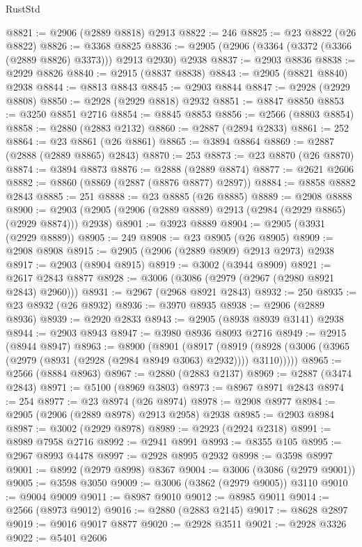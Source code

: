 \begin{lexlean}{RustStd}
\begin{coremodule}
@8821 := @2906 (@2889 @8818) @2913
@8822 := 246
@8825 := @23 @8822 (@26 @8822)
@8826 := @3368 @8825
@8836 := @2905 (@2906 (@3364 (@3372 (@3366 (@2889 @8826) @3373))) @2913 @2930) @2938
@8837 := @2903 @8836
@8838 := @2929 @8826
@8840 := @2915 (@8837 @8838)
@8843 := @2905 (@8821 @8840) @2938
@8844 := @8813 @8843
@8845 := @2903 @8844
@8847 := @2928 (@2929 @8808)
@8850 := @2928 (@2929 @8818) @2932
@8851 := @8847 @8850
@8853 := @3250 @8851 @2716
@8854 := @8845 @8853
@8856 := @2566 (@8803 @8854)
@8858 := @2880 (@2883 @2132)
@8860 := @2887 (@2894 @2833)
@8861 := 252
@8864 := @23 @8861 (@26 @8861)
@8865 := @3894 @8864
@8869 := @2887 (@2888 (@2889 @8865) @2843)
@8870 := 253
@8873 := @23 @8870 (@26 @8870)
@8874 := @3894 @8873
@8876 := @2888 (@2889 @8874)
@8877 := @2621 @2606
@8882 := @8860 (@8869 (@2887 (@8876 @8877) @2897))
@8884 := @8858 @8882 @2843
@8885 := 251
@8888 := @23 @8885 (@26 @8885)
@8889 := @2908 @8888
@8900 := @2903 (@2905 (@2906 (@2889 @8889) @2913 (@2984 (@2929 @8865) (@2929 @8874))) @2938)
@8901 := @3923 @8889
@8904 := @2905 (@3931 (@2929 @8889))
@8905 := 249
@8908 := @23 @8905 (@26 @8905)
@8909 := @2908 @8908
@8915 := @2905 (@2906 (@2889 @8909) @2913 @2973) @2938
@8917 := @2903 (@8904 @8915)
@8919 := @3002 (@3944 @8909)
@8921 := @2617 @2843 @8877
@8928 := @3006 (@3086 (@2979 (@2967 (@2980 @8921 @2843) @2960)))
@8931 := @2967 (@2968 @8921 @2843)
@8932 := 250
@8935 := @23 @8932 (@26 @8932)
@8936 := @3970 @8935
@8938 := @2906 (@2889 @8936)
@8939 := @2920 @2833
@8943 := @2905 (@8938 @8939 @3141) @2938
@8944 := @2903 @8943
@8947 := @3980 @8936 @8093 @2716
@8949 := @2915 (@8944 @8947)
@8963 := @8900
    (@8901
      (@8917
        (@8919 (@8928 (@3006 (@3965 (@2979 (@8931 (@2928 (@2984 @8949 @3063) @2932)))) @3110)))))
@8965 := @2566 (@8884 @8963)
@8967 := @2880 (@2883 @2137)
@8969 := @2887 (@3474 @2843)
@8971 := @5100 (@8969 @3803)
@8973 := @8967 @8971 @2843
@8974 := 254
@8977 := @23 @8974 (@26 @8974)
@8978 := @2908 @8977
@8984 := @2905 (@2906 (@2889 @8978) @2913 @2958) @2938
@8985 := @2903 @8984
@8987 := @3002 (@2929 @8978)
@8989 := @2923 (@2924 @2318)
@8991 := @8989 @7958 @2716
@8992 := @2941 @8991
@8993 := @8355 @105
@8995 := @2967 @8993 @4478
@8997 := @2928 @8995 @2932
@8998 := @3598 @8997
@9001 := @8992 (@2979 @8998) @8367
@9004 := @3006 (@3086 (@2979 @9001))
@9005 := @3598 @3050
@9009 := @3006 (@3862 (@2979 @9005)) @3110
@9010 := @9004 @9009
@9011 := @8987 @9010
@9012 := @8985 @9011
@9014 := @2566 (@8973 @9012)
@9016 := @2880 (@2883 @2145)
@9017 := @8628 @2897
@9019 := @9016 @9017 @8877
@9020 := @2928 @3511
@9021 := @2928 @3326
@9022 := @5401 @2606

\end{coremodule}
\end{lexlean}
